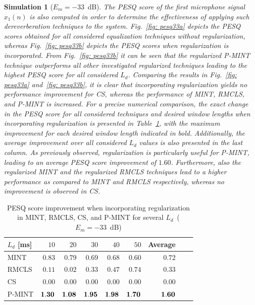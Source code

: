 \documentclass[10pt]{IEEEtran}
\newtheorem{simulation}{Simulation}
\begin{document}
\begin{simulation}[$E_m=-33$~dB]
The PESQ score of the first microphone signal $x_1(n)$ is also computed in order to determine the effectiveness of applying such dereverberation techniques to the system.
Fig.~\ref{fig: pesq33a} depicts the PESQ scores obtained for all considered equalization techniques without regularization, whereas Fig.~\ref{fig: pesq33b} depicts the PESQ scores when regularization is incorporated.
From Fig.~\ref{fig: pesq33b} it can be seen that the regularized P-MINT technique outperforms all other investigated regularized techniques leading to the highest PESQ score for all considered $L_d$.
Comparing the results in Fig.~\ref{fig: pesq33a} and~\ref{fig: pesq33b}, it is clear that incorporating regularization yields no performance improvement for CS, whereas the performance of MINT, RMCLS, and P-MINT is increased.
For a precise numerical comparison, the exact change in the PESQ score for all considered techniques and desired window lengths when incorporating regularization is presented in Table~\ref{tbl: pesq1}, with the maximum improvement for each desired window length indicated in bold.
Additionally, the average improvement over all considered $L_d$ values is also presented in the last column.
As previously observed, regularization is particularly useful for P-MINT, leading to an average PESQ score improvement of $1.60$.
Furthermore, also the regularized MINT and the regularized RMCLS techniques lead to a higher performance as compared to MINT and RMCLS respectively, whereas no improvement is observed in CS.
\end{simulation}
\begin{table}[b]
\centering
\caption{PESQ score improvement when incorporating regularization in MINT, RMCLS, CS, and P-MINT for several $L_d$~($E_m = -33$~dB)}
\label{tbl: pesq1}
\begin{tabular}{|l|r|r|r|r|r|r|r|r|}
\hline
$L_d$ [ms] & $10$ & $20$ & $30$ & $40$ & $50$ & Average  \\
\hline
MINT & $0.83$ & $0.79$ & $0.69$ & $0.68$ & $0.60$ & $0.72$ \\
\hline
RMCLS & $0.11$ & $0.02$ & $0.33$ & $0.47$ & $0.74$ & $0.33$ \\
\hline
CS & $0.00$ & $0.00$ & $0.00$ & $0.00$ & $0.00$ & $0.00$ \\
\hline
P-MINT & $\bf{1.30}$ & $\bf{1.08}$ & $\bf{1.95}$ & $\bf{1.98}$ & $\bf{1.70}$ & $\bf{1.60}$ \\
\hline
\end{tabular}

\end{table}
\end{document}
